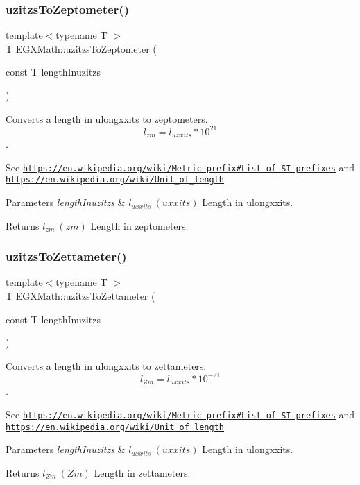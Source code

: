 \subsubsection{\texorpdfstring{uzitzs\+To\+Zeptometer()}{uzitzsToZeptometer()}}
{\footnotesize\ttfamily template$<$typename T $>$ \\
T E\+G\+X\+Math\+::uzitzs\+To\+Zeptometer (\begin{DoxyParamCaption}\item[{const T}]{length\+Inuzitzs }\end{DoxyParamCaption})}



Converts a length in ulongxxits to zeptometers. \[ l_{zm}=l_{uxxits} * 10^{21} \]. 

See \href{https://en.wikipedia.org/wiki/Metric_prefix#List_of_SI_prefixes}{\tt https\+://en.\+wikipedia.\+org/wiki/\+Metric\+\_\+prefix\#\+List\+\_\+of\+\_\+\+S\+I\+\_\+prefixes} and \href{https://en.wikipedia.org/wiki/Unit_of_length}{\tt https\+://en.\+wikipedia.\+org/wiki/\+Unit\+\_\+of\+\_\+length} 
\begin{DoxyParams}{Parameters}
{\em length\+Inuzitzs} & $ l_{uxxits}\ (uxxits)$ Length in ulongxxits. \\
\hline
\end{DoxyParams}
\begin{DoxyReturn}{Returns}
$ l_{zm}\ (zm)$ Length in zeptometers. 
\end{DoxyReturn}
\mbox{\label{group___e_g_x_math-_conversions-_length_conversions-_non-_s_i-uzitzs-_s_i_ga43f793911855da08c6649eb9b059d9c2}} 
\subsubsection{\texorpdfstring{uzitzs\+To\+Zettameter()}{uzitzsToZettameter()}}
{\footnotesize\ttfamily template$<$typename T $>$ \\
T E\+G\+X\+Math\+::uzitzs\+To\+Zettameter (\begin{DoxyParamCaption}\item[{const T}]{length\+Inuzitzs }\end{DoxyParamCaption})}



Converts a length in ulongxxits to zettameters. \[ l_{Zm}=l_{uxxits} * 10^{-21} \]. 

See \href{https://en.wikipedia.org/wiki/Metric_prefix#List_of_SI_prefixes}{\tt https\+://en.\+wikipedia.\+org/wiki/\+Metric\+\_\+prefix\#\+List\+\_\+of\+\_\+\+S\+I\+\_\+prefixes} and \href{https://en.wikipedia.org/wiki/Unit_of_length}{\tt https\+://en.\+wikipedia.\+org/wiki/\+Unit\+\_\+of\+\_\+length} 
\begin{DoxyParams}{Parameters}
{\em length\+Inuzitzs} & $ l_{uxxits}\ (uxxits)$ Length in ulongxxits. \\
\hline
\end{DoxyParams}
\begin{DoxyReturn}{Returns}
$ l_{Zm}\ (Zm)$ Length in zettameters. 
\end{DoxyReturn}
